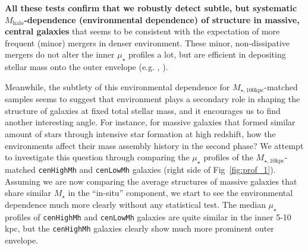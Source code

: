 \documentclass{emulateapj}
\def\rbcg{\texttt{cenHighMh}}
\def\nbcg{\texttt{cenLowMh}}
\def\mstar{{$M_{\star}$}}
\def\mhalo{{$M_{\mathrm{halo}}$}}
\def\minn{{$M_{\star,10\mathrm{kpc}}$}}
\def\mtot{{$M_{\star,100\mathrm{kpc}}$}}
\def\mden{{$\mu_{\star}$}}
\begin{document}
\begin{CJK*}{UTF8}{gbsn}
    \textbf{All these tests confirm that we robustly detect subtle, but systematic 
    \mhalo{}-dependence (environmental dependence) of structure in massive, 
    central galaxies} that seems to be consistent with the expectation of more frequent 
    (minor) mergers in denser environment. 
    These minor, non-dissipative mergers do not alter the inner \mden{} profiles 
    a lot, but are efficient in depositing stellar mass onto the outer envelope
    (e.g. \citealt{Hilz2013}, \citealt{Oogi2013}).
    

    Meanwhile, the subtlety of this environmental dependence for \mtot{}-matched 
    samples seems to suggest that environment plays a secondary role in shaping 
    the structure of galaxies at fixed total stellar mass, and it encourages us to find
    another interesting angle.  
    For instance, for massive galaxies that formed similar amount of stars through 
    intensive star formation at high redshift, how the environments affect their mass 
    assembly history in the second phase? 
    We attempt to investigate this question through comparing the \mden{} profiles of 
    the \minn{}-matched \rbcg{} and \nbcg{} galaxies (right side of 
    Fig~\ref{fig:prof_1}).
    Assuming we are now comparing the average structures of massive galaxies that share 
    similar \mstar{} in the ``in-situ'' component, we start to see the environmental 
    dependence much more clearly without any statistical test.     
    The median \mden{} profiles of \rbcg{} and \nbcg{} galaxies are quite similar in 
    the inner 5-10 kpc, but the \rbcg{} galaxies clearly show much more prominent
    outer envelope.     
    

\end{CJK*}
\end{document}
